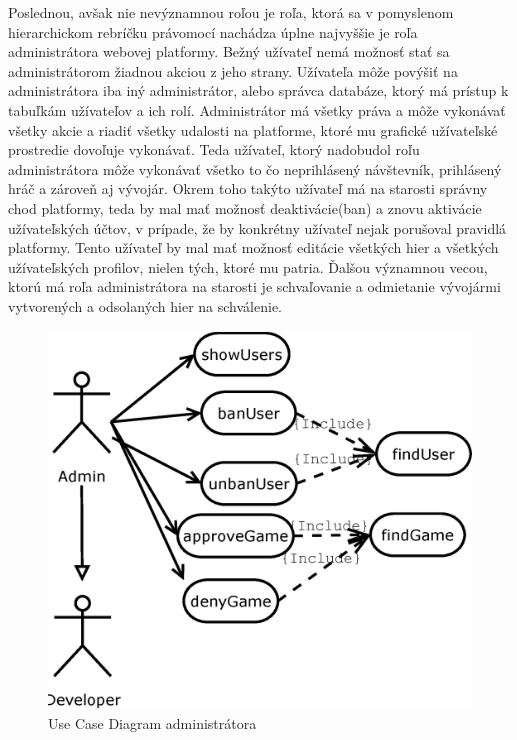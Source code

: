 Poslednou, avšak nie nevýznamnou roľou je roľa, ktorá sa v pomyslenom hierarchickom rebríčku právomocí nachádza úplne najvyššie je roľa administrátora webovej platformy. Bežný užívateľ nemá možnosť stať sa administrátorom žiadnou akciou z jeho strany. Užívateľa môže povýšiť na administrátora iba iný administrátor, alebo správca databáze, ktorý má prístup k tabuľkám užívateľov a ich rolí. Administrátor má všetky práva a môže vykonávať všetky akcie a riadiť všetky udalosti na platforme, ktoré mu grafické užívateľské prostredie dovoľuje vykonávať. Teda užívateľ, ktorý nadobudol roľu administrátora môže vykonávať všetko to čo neprihlásený návštevník, prihlásený hráč a zároveň aj vývojár. Okrem toho takýto užívateľ má na starosti správny chod platformy, teda by mal mať možnosť deaktivácie(ban) a znovu aktivácie užívateľských účtov, v prípade, že by konkrétny užívateľ nejak porušoval pravidlá platformy. Tento užívateľ by mal mať možnosť editácie všetkých hier a všetkých užívateľských profilov, nielen tých, ktoré mu patria. Ďalšou významnou vecou, ktorú má roľa administrátora na starosti je schvaľovanie a odmietanie vývojármi vytvorených a odsolaných hier na schválenie. 
\begin{figure}[h]
  \centering
  \includegraphics[scale=0.4]{fig/ucd-admin.eps}
  \caption{Use Case Diagram administrátora}
  \label{fig:ucdadmin}
\end{figure}

